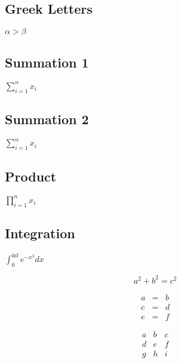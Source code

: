\subsection{Greek Letters}
$\alpha > \beta$


\subsection{Summation 1}
$\sum_{i=1}^n{x_i}$

\subsection{Summation 2}
$\displaystyle{\sum_{i=1}^n{x_i}}$

\subsection{Product}
$\prod_{i=1}^n{x_i}$

\subsection{Integration}
$\int_0^{\inf} e^{-x^2}dx$

\begin{equation}
a^2 + b^2 = c^2
\end{equation}

\begin{equation}
\begin{array}{ccc}
a & = & b \\
c & = & d  \\
e & = & f
\end{array}
\end{equation}


\begin{equation}
\begin{matrix}
	a & b & c \\
	d & e & f \\
	g & h & i 
\end{matrix}
\end{equation}


